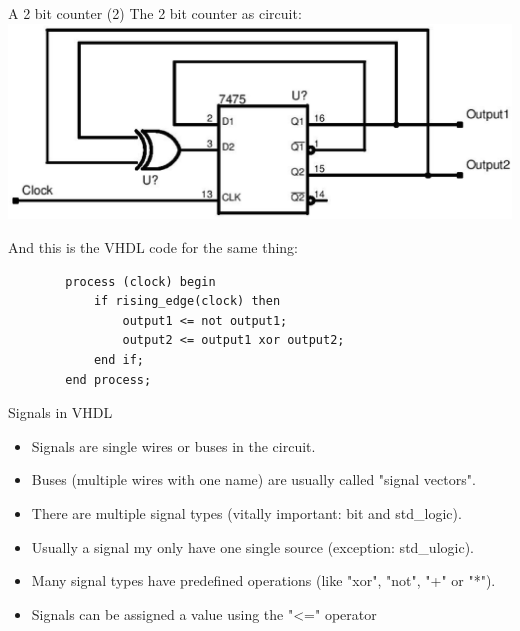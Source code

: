 \documentclass[pdf]{prosper}
\begin{document}
\begin{slide}{A 2 bit counter (2)}
The 2 bit counter as circuit:
\includegraphics[scale=.25]{bcount.eps}

\vspace*{.3cm}
And this is the VHDL code for the same thing:\\
\begin{verbatim}
        process (clock) begin
            if rising_edge(clock) then
                output1 <= not output1;
                output2 <= output1 xor output2;
            end if;
        end process;
\end{verbatim}

\end{slide}

\begin{slide}{Signals in VHDL}
\begin{itemize}
\item Signals are single wires or buses in the circuit.
\vspace*{.3cm}
\item Buses (multiple wires with one name) are usually called "signal vectors".
\vspace*{.3cm}
\item There are multiple signal types (vitally important: bit and std\_logic).
\vspace*{.3cm}
\item Usually a signal my only have one single source (exception: std\_ulogic).
\vspace*{.3cm}
\item Many signal types have predefined operations (like "xor", "not", "+" or "*").
\vspace*{.3cm}
\item Signals can be assigned a value using the "<=" operator
\end{itemize}
\end{slide}
\end{document}
